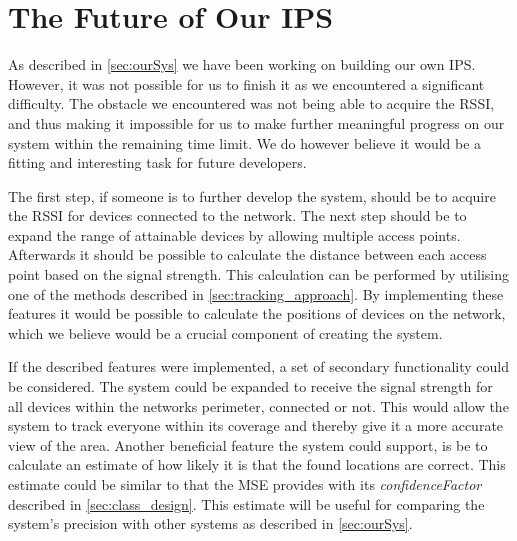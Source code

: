 \section{The Future of Our IPS}\label{sec:futureSystem}
As described in \cref{sec:ourSys} we have been working on building our own IPS. However, it was not possible for us to finish it as we encountered a significant difficulty. The obstacle we encountered was not being able to acquire the RSSI, and thus making it impossible for us to make further meaningful progress on our system within the remaining time limit. We do however believe it would be a fitting and interesting task for future developers.

The first step, if someone is to further develop the system, should be to acquire the RSSI for devices connected to the network. The next step should be to expand the range of attainable devices by allowing multiple access points. Afterwards it should be possible to calculate the distance between each access point based on the signal strength. This calculation can be performed by utilising one of the methods described in \cref{sec:tracking_approach}. By implementing these features it would be possible to calculate the positions of devices on the network, which we believe would be a crucial component of creating the system.

If the described features were implemented, a set of secondary functionality could be considered. The system could be expanded to receive the signal strength for all devices within the networks perimeter, connected or not. This would allow the system to track everyone within its coverage and thereby give it a more accurate view of the area.
Another beneficial feature the system could support, is be to calculate an estimate of how likely it is that the found locations are correct. This estimate could be similar to that the MSE provides with its \textit{confidenceFactor} described in \cref{sec:class_design}. This estimate will be useful for comparing the system's precision with other systems as described in \cref{sec:ourSys}.